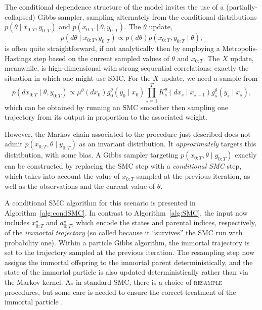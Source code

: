 The conditional dependence structure of the model invites the use of a (partially-collapsed) Gibbs sampler, sampling alternately from the conditional distributions $p(\theta \mid x_{0:T}, y_{0:T})$ and $p(x_{0:T} \mid \theta, y_{0:T})$.
The $\theta$ update,
\begin{equation*}
p(d\theta \mid x_{0:T}, y_{0:T}) \propto p(d\theta) p(x_{0:T}, y_{0:T} \mid \theta) ,
\end{equation*}
is often quite straightforward, if not analytically then by employing a Metropolis-Hastings step based on the current sampled values of $\theta$ and $x_{0:T}$. 
The $X$ update, meanwhile, is high-dimensional with strong sequential correlations: exactly the situation in which one might use SMC. 
For the $X$ update, we need a sample from
\begin{equation}\label{eq:PG_Xposterior}
p(dx_{0:T} \mid \theta, y_{0:T}) 
\propto \mu^\theta(dx_0) g_0^\theta(y_0\mid x_0) \prod_{s=1}^T K_s^\theta(dx_s \mid x_{s-1}) g_s^\theta(y_s \mid x_s) ,
\end{equation}
which can be obtained by running an SMC smoother then sampling one trajectory from its output in proportion to the associated weight.

However, the Markov chain associated to the procedure just described does not admit $p(x_{0:T},\theta \mid y_{0:T})$ as an invariant distribution. It \emph{approximately} targets this distribution, with some bias.
A Gibbs sampler targeting $p(x_{0:T},\theta \mid y_{0:T})$ exactly can be constructed by replacing the SMC step with a \emph{conditional SMC} step, which takes into account the value of $x_{0:T}$ sampled at the previous iteration, as well as the observations and the current value of $\theta$.

A conditional SMC algorithm for this scenario is presented in Algorithm~\ref{alg:condSMC}.
In contrast to Algorithm~\ref{alg:SMC}, the input now includes $x_{0:T}^\star$ and $a_{0:T}^\star$, which encode the states and parental indices, respectively, of the \emph{immortal trajectory} (so called because it ``survives'' the SMC run with probability one). Within a particle Gibbs algorithm, the immortal trajectory is set to the trajectory sampled at the previous iteration.
The resampling step now assigns the immortal offspring to the immortal parent deterministically, and the state of the immortal particle is also updated deterministically rather than via the Markov kernel.
As in standard SMC, there is a choice of \textsc{resample} procedures, but some care is needed to ensure the correct treatment of the immortal particle \parencite{lee2019}.


